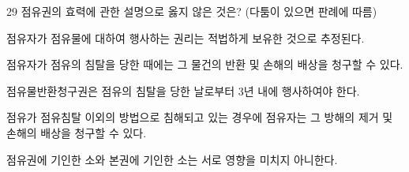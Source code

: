 \begin{question}{29}
점유권의 효력에 관한 설명으로 옳지 않은 것은? (다툼이 있으면 판례에 따름)
\begin{choices}
  \item 점유자가 점유물에 대하여 행사하는 권리는 적법하게 보유한 것으로 추정된다.
  \item 점유자가 점유의 침탈을 당한 때에는 그 물건의 반환 및 손해의 배상을 청구할 수 있다.
  \item 점유물반환청구권은 점유의 침탈을 당한 날로부터 3년 내에 행사하여야 한다.
  \item 점유가 점유침탈 이외의 방법으로 침해되고 있는 경우에 점유자는 그 방해의 제거 및 손해의 배상을 청구할 수 있다.
  \item 점유권에 기인한 소와 본권에 기인한 소는 서로 영향을 미치지 아니한다.
\end{choices}
\end{question}
